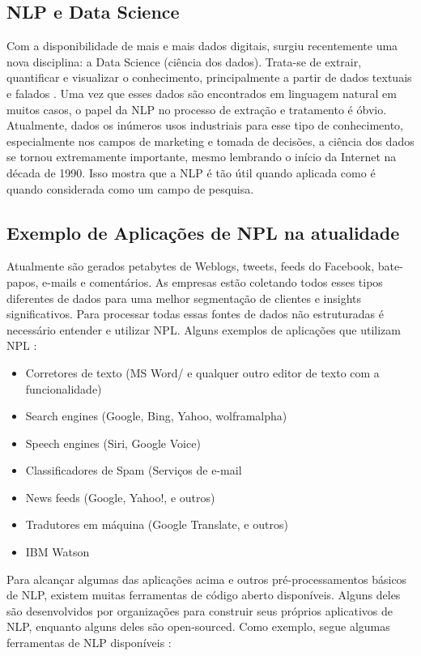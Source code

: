 \documentclass[
	12pt,				%
	openright,			%
	oneside,			%
	a4paper,			%
	english,			%
	spanish,			%
	brazil				%
	]{abntex2}
\begin{document}
	\subsection*{NLP e Data Science}	
	Com a disponibilidade de mais e mais dados digitais, surgiu recentemente uma nova disciplina: a Data Science (ciência dos dados). Trata-se de extrair, quantificar e visualizar o conhecimento, principalmente a partir de dados textuais e falados \cite{book_natural_lang}. Uma vez que esses dados são encontrados em linguagem natural em muitos casos, o papel da NLP no processo de extração e tratamento é óbvio. Atualmente, dados os inúmeros usos industriais para esse tipo de conhecimento, especialmente nos campos de marketing e tomada de decisões, a ciência dos dados se tornou extremamente importante, mesmo lembrando o início da Internet na década de 1990. Isso mostra que a NLP é tão útil quando aplicada como é quando considerada como um campo de pesquisa.

	\subsection*{Exemplo de Aplicações de NPL na atualidade}
	Atualmente são gerados petabytes de Weblogs, tweets, feeds do Facebook, bate-papos, e-mails e comentários. As empresas estão coletando todos esses tipos diferentes de dados para uma melhor segmentação de clientes e insights significativos. Para processar todas essas fontes de dados não estruturadas é necessário entender e utilizar NPL.
Alguns exemplos de aplicações que utilizam NPL \cite{book_natlang_python}:

	\begin{itemize}
	 	\item Corretores de texto (MS Word/ e qualquer outro editor de texto com a funcionalidade)
	 	\item Search engines (Google, Bing, Yahoo, wolframalpha)
	 	\item Speech engines (Siri, Google Voice)
	 	\item Classificadores de Spam (Serviços de e-mail
	 	\item News feeds (Google, Yahoo!, e outros)
	 	\item Tradutores em máquina (Google Translate, e outros)
	 	\item IBM Watson
	\end{itemize}

Para alcançar algumas das aplicações acima e outros pré-processamentos básicos de NLP, existem muitas ferramentas de código aberto disponíveis. Alguns deles são desenvolvidos por organizações para construir seus próprios aplicativos de NLP, enquanto alguns deles são open-sourced. Como exemplo, segue algumas ferramentas de NLP disponíveis \cite{book_natlang_python}:
\end{document}
